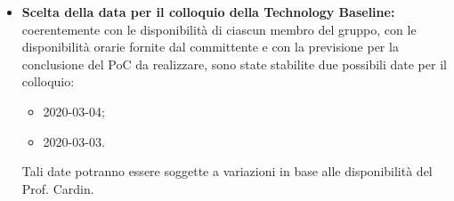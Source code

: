 \begin{itemize}
		\item \textbf{Scelta della data per il colloquio della Technology Baseline:} coerentemente con le disponibilità di ciascun membro del gruppo, con le disponibilità orarie fornite dal committente e con la previsione per la conclusione del PoC da realizzare, sono state stabilite due possibili date per il colloquio:
		\begin{itemize}
			\item 2020-03-04;
			\item 2020-03-03.
		\end{itemize}
		Tali date potranno essere soggette a variazioni in base alle disponibilità del Prof. Cardin.
	\end{itemize}